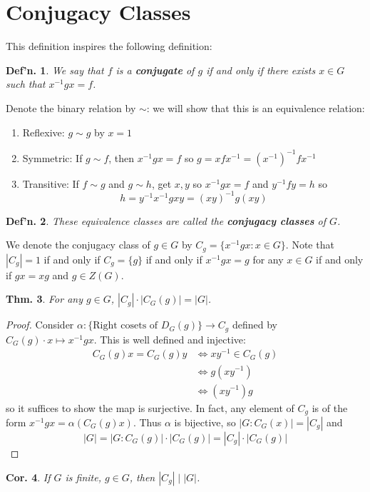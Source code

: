 \documentclass[12pt, a4paper]{book}
\newtheorem{theorem}{Thm.}[section]
\newtheorem{definition}[theorem]{Def'n.}
\newtheorem{corollary}[theorem]{Cor.}
\theoremstyle{nonumberplain}
\newtheorem{proof}{Proof}
\begin{document}
\section{Conjugacy Classes}
This definition inspires the following definition:
\begin{definition}
    We say that $f$ is a \textbf{conjugate} of $g$ if and only if there exists $x\in G$ such that $x^{-1}gx=f$.
\end{definition}
Denote the binary relation by $\sim$: we will show that this is an equivalence relation:
\begin{enumerate}[nolistsep]
    \item Reflexive: $g\sim g$ by $x=1$
    \item Symmetric: If $g\sim f$, then $x^{-1}gx=f$ so $g=xfx^{-1}=(x^{-1})^{-1}fx^{-1}$
    \item Transitive: If $f\sim g$ and $g\sim h$, get $x,y$ so $x^{-1}gx=f$ and $y^{-1}fy=h$ so
        \[h=y^{-1}x^{-1}gxy=(xy)^{-1}g(xy)\]
\end{enumerate}
\begin{definition}
    These equivalence classes are called the \textbf{conjugacy classes} of $G$.
\end{definition}
We denote the conjugacy class of $g\in G$ by $C_g=\{x^{-1}gx:x\in G\}$.
Note that $|C_g|=1$ if and only if $C_g=\{g\}$ if and only if $x^{-1}gx=g$ for any $x\in G$ if and only if $gx=xg$ and $g\in Z(G)$.
\begin{theorem}
    For any $g\in G$, $|C_g|\cdot|C_G(g)|=|G|$.
\end{theorem}
\begin{proof}
    Consider $\alpha:\{\text{Right cosets of $D_G(g)$}\}\longrightarrow C_g$ defined by $C_G(g)\cdot x\mapsto x^{-1}gx$.
    This is well defined and injective:
    \begin{align*}
        C_G(g)x=C_G(g)y &\Leftrightarrow xy^{-1}\in C_G(g)\\
                        &\Leftrightarrow g(xy^{-1})\\
                        &\Leftrightarrow (xy^{-1})g
    \end{align*}
    so it suffices to show the map is surjective.
    In fact, any element of $C_g$ is of the form $x^{-1}gx=\alpha(C_G(g)x)$.
    Thus $\alpha$ is bijective, so $|G:C_G(x)|=|C_g|$ and
    \[|G|=|G:C_G(g)|\cdot|C_G(g)|=|C_g|\cdot|C_G(g)|\]
\end{proof}
\begin{corollary}
    If $G$ is finite, $g\in G$, then $|C_g|\mid|G|$.
\end{corollary}
\end{document}
